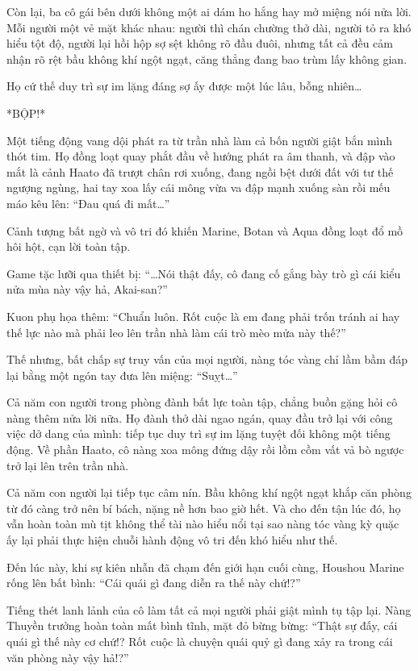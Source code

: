 \documentclass[../main.tex]{subfiles}
\begin{document}
Còn lại, ba cô gái bên dưới không một ai dám ho hắng hay mở miệng nói nửa lời. Mỗi người một vẻ mặt khác nhau: người thì chán chường thở dài, người tỏ ra khó hiểu tột độ, người lại hồi hộp sợ sệt không rõ đầu đuôi, nhưng tất cả đều cảm nhận rõ rệt bầu không khí ngột ngạt, căng thẳng đang bao trùm lấy không gian.


Họ cứ thế duy trì sự im lặng đáng sợ ấy được một lúc lâu, bỗng nhiên\dots

*BỘP!*

Một tiếng động vang dội phát ra từ trần nhà làm cả bốn người giật bắn mình thót tim. Họ đồng loạt quay phắt đầu về hướng phát ra âm thanh, và đập vào mắt là cảnh Haato đã trượt chân rơi xuống, đang ngồi bệt dưới đất với tư thế ngượng ngùng, hai tay xoa lấy cái mông vừa va đập mạnh xuống sàn rồi mếu máo kêu lên: ``Đau quá đi mất\dots''

Cảnh tượng bất ngờ và vô tri đó khiến Marine, Botan và Aqua đồng loạt đổ mồ hôi hột, cạn lời toàn tập.

Game tặc lưỡi qua thiết bị: ``\dots Nói thật đấy, cô đang cố gắng bày trò gì cái kiểu nửa mùa này vậy hả, Akai-san?''

Kuon phụ họa thêm: ``Chuẩn luôn. Rốt cuộc là em đang phải trốn tránh ai hay thế lực nào mà phải leo lên trần nhà làm cái trò mèo mửa này thế?''

Thế nhưng, bất chấp sự truy vấn của mọi người, nàng tóc vàng chỉ lầm bầm đáp lại bằng một ngón tay đưa lên miệng: ``Suỵt\dots''


Cả năm con người trong phòng đành bất lực toàn tập, chẳng buồn gặng hỏi cô nàng thêm nửa lời nữa. Họ đành thở dài ngao ngán, quay đầu trở lại với công việc dở dang của mình: tiếp tục duy trì sự im lặng tuyệt đối không một tiếng động. Về phần Haato, cô nàng xoa mông đứng dậy rồi lồm cồm vất vả bò ngược trở lại lên trên trần nhà.

Cả năm con người lại tiếp tục câm nín. Bầu không khí ngột ngạt khắp căn phòng từ đó càng trở nên bí bách, nặng nề hơn bao giờ hết. Và cho đến tận lúc đó, họ vẫn hoàn toàn mù tịt không thể tài nào hiểu nổi tại sao nàng tóc vàng kỳ quặc ấy lại phải thực hiện chuỗi hành động vô tri đến khó hiểu như thế.

Đến lúc này, khi sự kiên nhẫn đã chạm đến giới hạn cuối cùng, Houshou Marine rống lên bất bình: ``Cái quái gì đang diễn ra thế này chứ!?''

Tiếng thét lanh lảnh của cô làm tất cả mọi người phải giật mình tụ tập lại. Nàng Thuyền trưởng hoàn toàn mất bình tĩnh, mặt đỏ bừng bừng: ``Thật sự đấy, cái quái gì thế này cơ chứ!? Rốt cuộc là chuyện quái quỷ gì đang xảy ra trong cái văn phòng này vậy hả!?''
\end{document}
